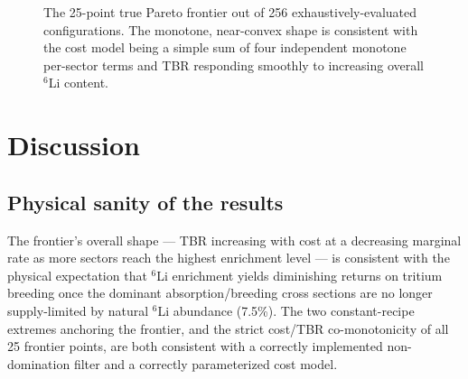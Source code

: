 \documentclass[11pt]{article}
\begin{document}
\begin{figure}[h]
\centering
{}
\caption{The 25-point true Pareto frontier out of 256 exhaustively-evaluated
configurations. The monotone, near-convex shape is consistent with the
cost model being a simple sum of four independent monotone per-sector
terms and TBR responding smoothly to increasing overall $^6$Li content.}
\end{figure}

\section{Discussion}

\subsection{Physical sanity of the results}

The frontier's overall shape --- TBR increasing with cost at a
decreasing marginal rate as more sectors reach the highest enrichment
level --- is consistent with the physical expectation that $^6$Li
enrichment yields diminishing returns on tritium breeding once the
dominant absorption/breeding cross sections are no longer supply-limited
by natural $^6$Li abundance (7.5\%). The two constant-recipe extremes
anchoring the frontier, and the strict cost/TBR co-monotonicity of all 25
frontier points, are both consistent with a correctly implemented
non-domination filter and a correctly parameterized cost model.
\end{document}
